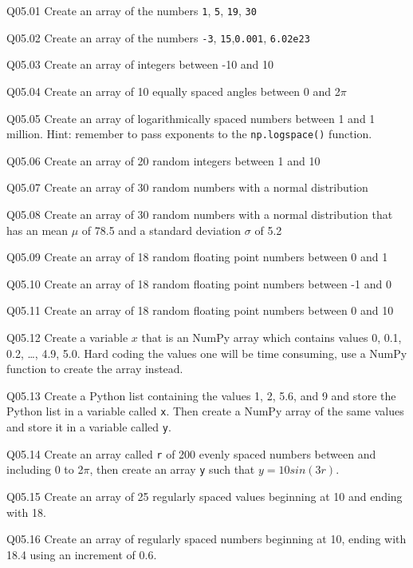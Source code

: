\documentclass{book}
\newenvironment{problems}{}{}  %
\newcommand{\passthrough}[1]{#1}
\begin{document}
    
        \begin{problems}
        Q05.01 Create an array of the numbers \passthrough{\lstinline!1!},
\passthrough{\lstinline!5!}, \passthrough{\lstinline!19!},
\passthrough{\lstinline!30!}

Q05.02 Create an array of the numbers \passthrough{\lstinline!-3!},
\passthrough{\lstinline!15!},\passthrough{\lstinline!0.001!},
\passthrough{\lstinline!6.02e23!}

Q05.03 Create an array of integers between -10 and 10

Q05.04 Create an array of 10 equally spaced angles between 0 and
2\(\pi\)

Q05.05 Create an array of logarithmically spaced numbers between 1 and 1
million. Hint: remember to pass exponents to the
\passthrough{\lstinline!np.logspace()!} function.

Q05.06 Create an array of 20 random integers between 1 and 10

Q05.07 Create an array of 30 random numbers with a normal distribution

Q05.08 Create an array of 30 random numbers with a normal distribution
that has an mean \(\mu\) of 78.5 and a standard deviation \(\sigma\) of
5.2

Q05.09 Create an array of 18 random floating point numbers between 0 and
1

Q05.10 Create an array of 18 random floating point numbers between -1
and 0

Q05.11 Create an array of 18 random floating point numbers between 0 and
10

Q05.12 Create a variable \(x\) that is an NumPy array which contains
values 0, 0.1, 0.2, \ldots{}, 4.9, 5.0. Hard coding the values one will
be time consuming, use a NumPy function to create the array instead.

Q05.13 Create a Python list containing the values 1, 2, 5.6, and 9 and
store the Python list in a variable called \passthrough{\lstinline!x!}.
Then create a NumPy array of the same values and store it in a variable
called \passthrough{\lstinline!y!}.

Q05.14 Create an array called \passthrough{\lstinline!r!} of 200 evenly
spaced numbers between and including 0 to 2\(\pi\), then create an array
\passthrough{\lstinline!y!} such that \(y=10sin(3r)\).

Q05.15 Create an array of 25 regularly spaced values beginning at 10 and
ending with 18.

Q05.16 Create an array of regularly spaced numbers beginning at 10,
ending with 18.4 using an increment of 0.6.
        \end{problems}
\end{document}
